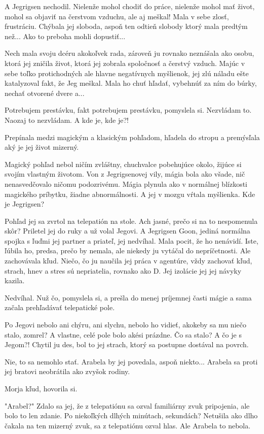 \documentclass{book}
\begin{document}
A Jegrigsen nechodil. Nielenže mohol chodiť do práce, nielenže mohol mať život, mohol sa objaviť na čerstvom vzduchu, ale aj meškal! Mala v sebe zlosť, frustráciu. Chýbala jej sloboda, aspoň ten odtieň slobody ktorý mala predtým než... Ako to preboha mohli dopustiť...

Nech mala svoju dcéru akokoľvek rada, zároveň ju rovnako neznášala ako osobu, ktorá jej zničila život, ktorá jej zobrala spoločnosť a čerstvý vzduch. Majúc v sebe toľko protichodných ale hlavne negatívnych myšlienok, jej zlú náladu ešte katalyzoval fakt, že Jeg meškal. Mala ho chuť hľadať, vybehnúť za ním do búrky, nechať otvorené dvere a...

Potrebujem prestávku, fakt potrebujem prestávku, pomyslela si. Nezvládam to. Naozaj to nezvládam. A kde je, kde je?!

Prepínala medzi magickým a klasickým pohľadom, hľadela do stropu a premýsľala aký je jej život mizerný.

Magický pohľad nebol ničím zvláštny, chuchvalce pobehujúce okolo, žijúce si svojím vlastným životom. Von z Jegrigsenovej vily, mágia bola ako všade, nič nenasvedčovalo ničomu podozrivému. Mágia plynula ako v normálnej blízkosti magického príbytku, žiadne abnormálnosti. A jej v mozgu vŕtala myšlienka. Kde je Jegrigsen?

Pohľad jej sa zvrtol na telepatión na stole. Ach jasné, prečo si na to nespomenula skôr? Priletel jej do ruky a už volal Jegovi. A Jegrigsen Goon, jediná normálna spojka s ľuďmi jej partner a priateľ, jej nedvíhal. Mala pocit, že ho nenávidí. Iste, ľúbila ho, predsa, prečo by nemala, ale niekedy ju vytáčal do nepríčetnosti. Ale zachovávala kľud. Niečo, čo ju naučila jej práca v agentúre, vždy zachovať kľud, strach, hnev a stres sú nepriatelia, rovnako ako D. Jej izolácie jej jej návyky kazila.

Nedvíhal. Nuž čo, pomyslela si, a prešla do menej príjemnej časti mágie a sama začala prehľadávať telepatické pole.

Po Jegovi nebolo ani chýru, ani slychu, nebolo ho vidieť, akokeby sa mu niečo stalo, zomrel? A vlastne, celé pole bolo akési prázdne. Čo sa stalo? A čo je s Jegom?! Chytil ju des, bol to jej strach, ktorý sa postupne dostával na povrch.

Nie, to sa nemohlo stať. Arabela by jej povedala, aspoň niekto... Arabela sa proti jej bratovi neobrátila ako zvyšok rodiny.

Morja kľud, hovorila si.

"Arabel?" Zdalo sa jej, že z telepatiónu sa ozval familiárny zvuk pripojenia, ale bolo to len zdanie. Po niekoľkých dlhých minútach, sekundách? Netušila ako dlho čakala na ten mizerný zvuk, sa z telepatiónu ozval hlas. Ale Arabela to nebola.
\end{document}
